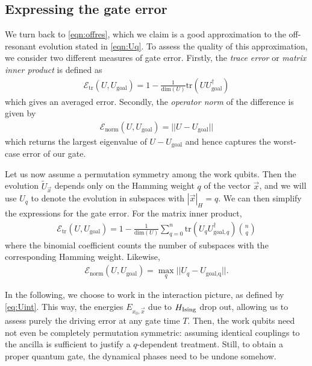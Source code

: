 \subsection{Expressing the gate error}
We turn back to \cref{eqn:offres}, which we claim is a good approximation to the off-resonant evolution stated in \cref{eqn:Uq}. To assess the quality of this approximation, we consider two different measures of gate error. Firstly, the \emph{trace error} or \emph{matrix inner product} is defined as
\begin{align*}
\mathcal{E}_\text{tr} (U, U_\text{goal}) = 1 - \frac{1}{\text{dim}(U)} \text{tr}( U U_\text{goal}^\dagger )
\end{align*}
which gives an averaged error. Secondly, the \emph{operator norm} of the difference is given by 
\begin{align*}
\mathcal{E}_\text{norm}(U, U_\text{goal}) = || U - U_\text{goal} ||
\end{align*}
which returns the largest eigenvalue of $U - U_\text{goal}$ and hence captures the worst-case error of our gate. 

Let us now assume a permutation symmetry among the work qubits. Then the evolution $\tilde{U}_{\vec{x}}$ depends only on the Hamming weight $q$ of the vector $\vec{x}$, and we will use $U_q$ to denote the evolution in subspaces with $|\vec{x}|_H = q$. We can then simplify the expressions for the gate error. For the matrix inner product,
\begin{align*}
\mathcal{E}_\text{tr} (U, U_\text{goal}) = 1 - \frac{1}{\text{dim}(U)}  \sum_{q=0}^n \text{tr}( U_q  U_{\text{goal},q}^\dagger ) { n \choose q }
\end{align*}
where the binomial coefficient counts the number of subspaces with the corresponding Hamming weight. Likewise, 
%
\begin{align*}
\mathcal{E}_\text{norm}(U, U_\text{goal}) = \max_q || U_q - U_\text{goal,q} ||.
\end{align*}

In the following, we choose to work in the interaction picture, as defined by \cref{eq:Uint}. This way, the energies $E_{x_0, \vec{x}}$ due to $H_\text{Ising}$ drop out, allowing us to assess purely the driving error at any gate time $T$. Then, the work qubits need not even be completely permutation symmetric: assuming identical couplings to the ancilla is sufficient to justify a $q$-dependent treatment. Still, to obtain a proper quantum gate, the dynamical phases need to be undone somehow. 

